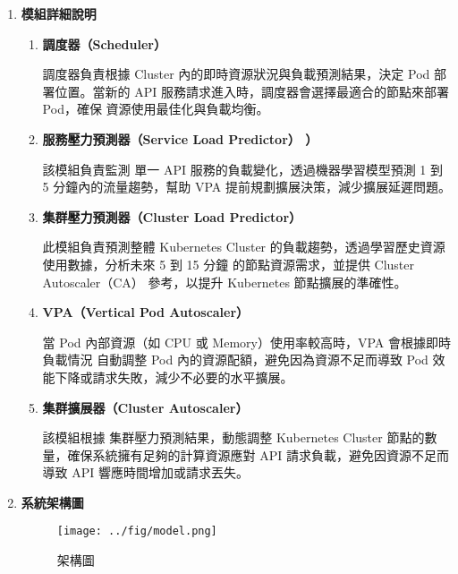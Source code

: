 \documentclass[12pt,a4paper]{article}
\begin{document}
\begin{enumerate}[label={(\zhdig*)}, leftmargin=2\parindent, listparindent=\parindent]
\begin{enumerate}[label={(\arabic*)}, leftmargin=\parindent, listparindent=\parindent]
\begin{enumerate}[label={(\zhdig*)}, leftmargin=\parindent, listparindent=\parindent]
\begin{enumerate}[label={(\arabic*)}, leftmargin=\parindent, listparindent=\parindent]
\end{enumerate}

\end{enumerate}


\item \textbf{
模組詳細說明}
\begin{enumerate}[label={(\zhdig*)}, leftmargin=\parindent, listparindent=\parindent]

    \item \textbf{
調度器（Scheduler）}

調度器負責根據 Cluster 內的即時資源狀況與負載預測結果，決定 Pod 部署位置。當新的 API 服務請求進入時，調度器會選擇最適合的節點來部署 Pod，確保 資源使用最佳化與負載均衡。

    \item \textbf{
服務壓力預測器（Service Load Predictor）
）}

該模組負責監測 單一 API 服務的負載變化，透過機器學習模型預測 1 到 5 分鐘內的流量趨勢，幫助 VPA 提前規劃擴展決策，減少擴展延遲問題。

\item \textbf{集群壓力預測器（Cluster Load Predictor）}

此模組負責預測整體 Kubernetes Cluster 的負載趨勢，透過學習歷史資源使用數據，分析未來 5 到 15 分鐘 的節點資源需求，並提供 Cluster Autoscaler（CA） 參考，以提升 Kubernetes 節點擴展的準確性。

 \item \textbf{VPA（Vertical Pod Autoscaler）}

當 Pod 內部資源（如 CPU 或 Memory）使用率較高時，VPA 會根據即時負載情況 自動調整 Pod 內的資源配額，避免因為資源不足而導致 Pod 效能下降或請求失敗，減少不必要的水平擴展。
\item \textbf{
集群擴展器（Cluster Autoscaler）
}

該模組根據 集群壓力預測結果，動態調整 Kubernetes Cluster 節點的數量，確保系統擁有足夠的計算資源應對 API 請求負載，避免因資源不足而導致 API 響應時間增加或請求丟失。

\end{enumerate}
\item \textbf{
系統架構圖}

\begin{figure} [htbp]

\centering

\texttt{[image: ../fig/model.png]}

\caption{架構圖}

\end{figure}\newpage


\end{enumerate}
\end{enumerate}
\end{document}
